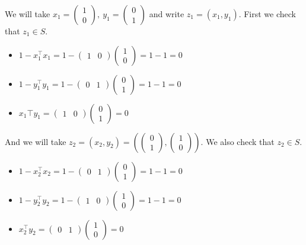 \documentclass{article}
\newcommand{\tp}{^\top}
\begin{document}
\noindent We will take $x_1 = \begin{pmatrix} 1\\ 0\end{pmatrix},\ y_1 = \begin{pmatrix} 0\\ 1\end{pmatrix}$ and write $z_1 = (x_1, y_1)$. First we check that $z_1 \in S$.
\begin{itemize}
\item $1-x_{1}\tp x_1=
1-
\begin{pmatrix} 1& 0\end{pmatrix}
\begin{pmatrix} 1\\ 0\end{pmatrix}
=1-1=0$
\item $1-y_{1}\tp y_1=
1-
\begin{pmatrix} 0& 1\end{pmatrix}
\begin{pmatrix} 0\\ 1\end{pmatrix}
=1-1=0$
\item $x_{1}\top y_1=
\begin{pmatrix} 1& 0\end{pmatrix}
\begin{pmatrix} 0\\ 1\end{pmatrix}
=0$
\end{itemize}
And we will take $z_2=(x_2,y_2)= \left(
\begin{pmatrix} 0\\ 1\end{pmatrix},
\begin{pmatrix} 1\\ 0\end{pmatrix}
\right)$. We also check that $z_2 \in S$.
\begin{itemize}
\item $1-x_{2}\tp x_2
=1-
\begin{pmatrix} 0& 1\end{pmatrix}
\begin{pmatrix} 0\\ 1\end{pmatrix}
=1-1=0$
\item $1-y_{2}\tp y_2
=1-
\begin{pmatrix} 1& 0\end{pmatrix}
\begin{pmatrix} 1\\ 0\end{pmatrix}
=1-1=0$
\item $x_{2}\tp y_2
=
\begin{pmatrix} 0& 1\end{pmatrix}
\begin{pmatrix} 1\\ 0\end{pmatrix}
=0$
\end{itemize}
\end{document}
